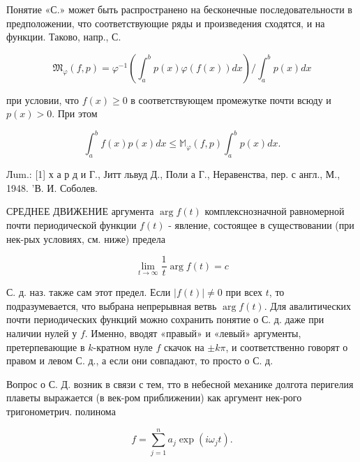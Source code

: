 \documentclass[10pt]{article}
\begin{document}
Понятие «С.» может быть распространено на бесконечные последовательности в предположении, что соответствующие ряды и произведения сходятся, и на функции. Таково, напр., С.



\[

\mathfrak{M}_{\varphi}(f, p)=\varphi^{-1}\left(\int_{a}^{b} p(x) \varphi(f(x)) d x\right) / \int_{a}^{b} p(x) d x

\]



при условии, что $f(x) \geqslant 0$ в соответствующем промежутке почти всюду и $p(x)>0$. При этом



\[

\int_{a}^{b} f(x) p(x) d x \leqslant \mathbb{M}_{\varphi}(f, p) \int_{a}^{b} p(x) d x .

\]



Лum.: [1] х а р д и Г., Јитт львуд Д., Поли а Г., Неравенства, пер. с англ., М., 1948. 'В. И. Соболев.



СРЕДНЕЕ ДВИЖЕНИЕ аргумента $\arg f(t)$ комплекснозначной равномерной почти периодической функции $f(t)$ - явление, состоящее в существовании (при нек-рых условиях, см. ниже) предела



\[

\lim _{t \rightarrow \infty} \frac{1}{t} \arg f(t)=c

\]



С. д. наз. также сам этот предел. Если $|f(t)| \neq 0$ при всех $t$, то подразумевается, что выбрана непрерывная ветвь $\arg f(t)$. Для авалитических почти периодических функций можно сохранить понятие о С. д. даже при наличии нулей у $f$. Именно, вводят «правый» и «левый» аргументы, претерпевающие в $k$-кратном нуле $f$ скачок на $\pm k \pi$, и соответственно говорят о правом и левом С. д., а если они совпадают, то просто о С. д.



Вопрос о С. Д. возник в связи с тем, тто в небесной механике долгота перигелия плаветы выражается (в век-ром приближении) как аргумент нек-рого тригонометрич. полинома



\[

f=\sum_{j=1}^{n} a_{j} \exp \left(i \omega_{j} t\right) .

\]
\end{document}
